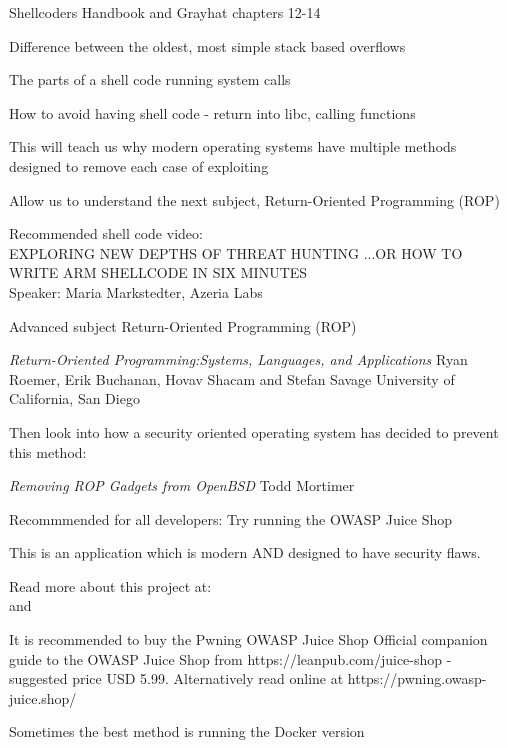 \documentclass[Screen16to9,17pt]{foils}
\begin{document}
\begin{list1}
\item Shellcoders Handbook  and Grayhat chapters 12-14
\item Difference between the oldest, most simple stack based overflows
\item The parts of a shell code running system calls
\item How to avoid having shell code - return into libc, calling functions
\item This will teach us why modern operating systems have multiple methods designed to remove each case of exploiting
\item Allow us to understand the next subject, Return-Oriented Programming (ROP)
\end{list1}

Recommended shell code video:\\
EXPLORING NEW DEPTHS OF THREAT HUNTING ...OR HOW TO WRITE ARM SHELLCODE IN SIX MINUTES\\
Speaker: Maria Markstedter, Azeria Labs\\



\begin{list1}
\item Advanced subject Return-Oriented Programming (ROP)
\item \emph{Return-Oriented Programming:Systems, Languages, and Applications}
Ryan Roemer, Erik Buchanan, Hovav Shacam and Stefan Savage University of California, San Diego\\
\item Then look into how a security oriented operating system has decided to prevent this method:
\item \emph{Removing ROP Gadgets from OpenBSD}
Todd Mortimer\\
\end{list1}


\begin{list1}
\item Recommmended for all developers: Try running the OWASP Juice Shop
\item This is an application which is modern AND designed to have security flaws.
\item Read more about this project at:\\
 and\\ 
\item It is recommended to buy the Pwning OWASP Juice Shop Official companion guide to the OWASP Juice Shop from https://leanpub.com/juice-shop - suggested price USD 5.99. Alternatively read online at https://pwning.owasp-juice.shop/
\item Sometimes the best method is running the Docker version
\end{list1}
\end{document}
